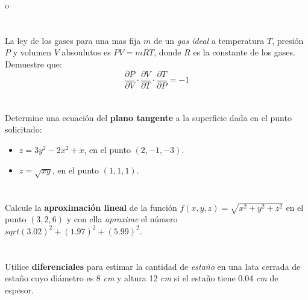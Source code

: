 o\documentclass[12pt]{article}
\begin{document}
\section{}

La ley de los gases para una mas fija $m$ de un \textit{gas ideal} a temperatura $T$, presión $P$ y volumen $V$ absoulutos es $P V = mRT$, donde $R$ es la constante de los gases. Demuestre que:
$$\frac{∂P}{∂V} \cdot \frac{∂V}{∂T} \cdot \frac{∂T}{∂P} = −1$$

\section{}

Determine una ecuación del \textbf{plano tangente} a la superficie dada en el punto solicitado:

\begin{itemize}[format=\textbf]

\item $z=3y^2-2x^2+x$, en el punto $(2,-1,-3)$.

\item $z=\sqrt{xy}$, en el punto $(1,1,1)$.

\end{itemize}

\section{}

Calcule la \textbf{aproximación lineal} de la función $f(x,y,z)=\sqrt{x^2+y^2+z^2}$ en el punto $(3,2,6)$ y con ella \textit{aproxime} el número $sqrt{(3.02)^2+(1.97)^2+(5.99)^2}$.

\section{}

Utilice \textbf{diferenciales} para estimar la cantidad de \textit{estaño} en una lata cerrada de estaño cuyo diámetro es 8 \textit{cm} y altura 12 \textit{cm} si el estaño tiene
0.04 \textit{cm} de espesor.
\end{document}
